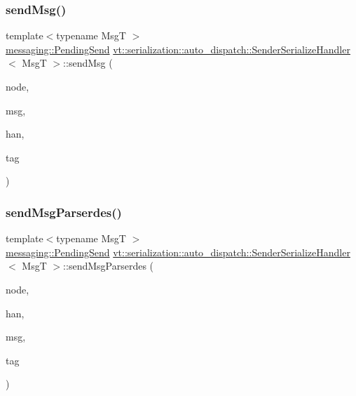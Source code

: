 \subsubsection{\texorpdfstring{send\+Msg()}{sendMsg()}}
{\footnotesize\ttfamily template$<$typename MsgT $>$ \\
\hyperlink{structvt_1_1messaging_1_1_pending_send}{messaging\+::\+Pending\+Send} \hyperlink{structvt_1_1serialization_1_1auto__dispatch_1_1_sender_serialize_handler}{vt\+::serialization\+::auto\+\_\+dispatch\+::\+Sender\+Serialize\+Handler}$<$ MsgT $>$\+::send\+Msg (\begin{DoxyParamCaption}\item[{\hyperlink{namespacevt_a866da9d0efc19c0a1ce79e9e492f47e2}{Node\+Type} const \&}]{node,  }\item[{MsgT $\ast$}]{msg,  }\item[{\hyperlink{namespacevt_af64846b57dfcaf104da3ef6967917573}{Handler\+Type} const \&}]{han,  }\item[{\hyperlink{namespacevt_a84ab281dae04a52a4b243d6bf62d0e52}{Tag\+Type} const \&}]{tag }\end{DoxyParamCaption})\hspace{0.3cm}{\ttfamily [static]}}

\mbox{\label{structvt_1_1serialization_1_1auto__dispatch_1_1_sender_serialize_handler_aa4c133e4b2d5102048a056fa9fe06c64}} 
\subsubsection{\texorpdfstring{send\+Msg\+Parserdes()}{sendMsgParserdes()}}
{\footnotesize\ttfamily template$<$typename MsgT $>$ \\
\hyperlink{structvt_1_1messaging_1_1_pending_send}{messaging\+::\+Pending\+Send} \hyperlink{structvt_1_1serialization_1_1auto__dispatch_1_1_sender_serialize_handler}{vt\+::serialization\+::auto\+\_\+dispatch\+::\+Sender\+Serialize\+Handler}$<$ MsgT $>$\+::send\+Msg\+Parserdes (\begin{DoxyParamCaption}\item[{\hyperlink{namespacevt_a866da9d0efc19c0a1ce79e9e492f47e2}{Node\+Type} const \&}]{node,  }\item[{\hyperlink{namespacevt_af64846b57dfcaf104da3ef6967917573}{Handler\+Type} const \&}]{han,  }\item[{MsgT $\ast$}]{msg,  }\item[{\hyperlink{namespacevt_a84ab281dae04a52a4b243d6bf62d0e52}{Tag\+Type} const \&}]{tag }\end{DoxyParamCaption})\hspace{0.3cm}{\ttfamily [static]}}



